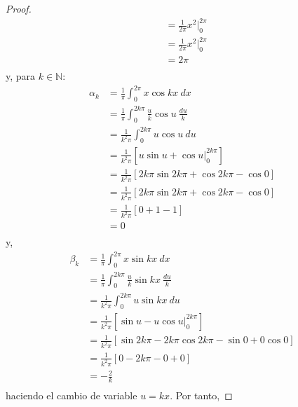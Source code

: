 \documentclass[12pt]{report}
\theoremstyle{largebreak}
\begin{document}
\begin{proof}
\begin{equation*}
\begin{split}
                &=\frac{1}{2\pi} x^{2}\Big|_{0}^{2\pi}\\
                &=\frac{1}{2\pi} x^{2}\Big|_{0}^{2\pi}\\
                &=2\pi\\
            \end{split}
        \end{equation*}
        y, para $k\in\mathbb{N}$:
        \begin{equation*}
            \begin{split}
                \alpha_k&=\frac{1}{\pi}\int_{0}^{2\pi}x\cos kx\:dx\\
                &=\frac{1}{\pi}\int_{0}^{2k\pi}\frac{u}{k}\cos u\: \frac{du}{k}\\
                &=\frac{1}{k^2\pi}\int_{0}^{2k\pi}u\cos u\:du\\
                &=\frac{1}{k^2\pi}\left[u\sin u+\cos u\Big|_{0}^{2k\pi}\right]\\
                &=\frac{1}{k^2\pi}\left[2k\pi\sin 2k\pi+\cos 2k\pi-\cos0\right]\\
                &=\frac{1}{k^2\pi}\left[2k\pi\sin 2k\pi+\cos 2k\pi-\cos0\right]\\
                &=\frac{1}{k^2\pi}\left[0+1-1\right]\\
                &=0\\
            \end{split}
        \end{equation*}
        y,
        \begin{equation*}
            \begin{split}
                \beta_k&=\frac{1}{\pi}\int_{0}^{2\pi} x\sin kx\:dx\\
                &=\frac{1}{\pi}\int_{0}^{2k\pi} \frac{u}{k}\sin kx\:\frac{du}{k}\\
                &=\frac{1}{k^2\pi}\int_{0}^{2k\pi} u\sin kx\:du\\
                &=\frac{1}{k^2\pi}\left[\sin u-u\cos u\Big|_{0}^{2k\pi}\right]\\
                &=\frac{1}{k^2\pi}\left[\sin 2k\pi-2k\pi\cos 2k\pi-\sin 0+0\cos 0\right]\\
                &=\frac{1}{k^2\pi}\left[0-2k\pi-0+0\right]\\
                &=-\frac{2}{k}\\
            \end{split}
        \end{equation*}
        haciendo el cambio de variable $u=kx$. Por tanto,

\end{proof}
\end{document}
